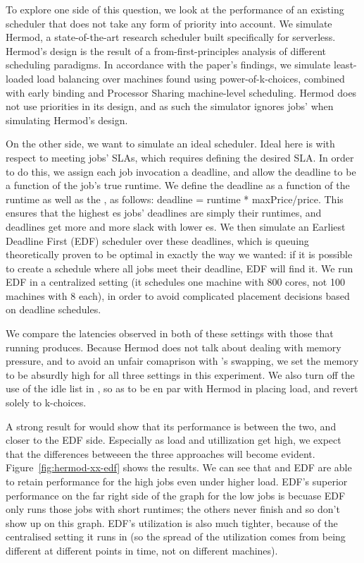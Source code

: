 To explore one side of this question, we look at the performance of an existing
scheduler that does not take any form of priority into account. We simulate
Hermod\cite{hermod}, a state-of-the-art research scheduler built specifically
for serverless. Hermod's design is the result of a from-first-principles
analysis of different scheduling paradigms. In accordance with the paper's
findings, we simulate least-loaded load balancing over machines found using
power-of-k-choices, combined with early binding and Processor Sharing
machine-level scheduling. Hermod does not use priorities in its design, and as
such the simulator ignores jobs' \class{} when simulating Hermod's design.


On the other side, we want to simulate an ideal scheduler. Ideal here is with
respect to meeting jobs' SLAs, which requires defining the desired SLA. In order
to do this, we assign each job invocation a deadline, and allow the deadline to
be a function of the job's true runtime. We define the deadline as a function of
the runtime as well as the \priceclass{}, as follows: deadline = runtime *
maxPrice/price. This ensures that the highest \class{}es jobs' deadlines are
simply their runtimes, and deadlines get more and more slack with lower
\class{}es. We then simulate an Earliest Deadline First (EDF) scheduler over
these deadlines, which is queuing theoretically proven to be optimal in exactly
the way we wanted: if it is possible to create a schedule where all jobs meet
their deadline, EDF will find it\cite{wiki-edf}. We run EDF in a centralized
setting (it schedules one machine with 800 cores, not 100 machines with 8 each),
in order to avoid complicated placement decisions based on deadline schedules.

We compare the latencies observed in both of these settings with those that
running \sys{} produces. Because Hermod does not talk about dealing with memory
pressure, and to avoid an unfair comaprison with \sys{}'s swapping, we set the
memory to be absurdly high for all three settings in this experiment. We also
turn off the use of the idle list in \sys{}, so as to be en par with Hermod in
placing load, and revert solely to k-choices.

A strong result for \sys{} would show that its performance is between the two,
and closer to the EDF side. Especially as load and utillization get high, we
expect that the differences betweeen the three approaches will become evident.
Figure~\ref{fig:hermod-xx-edf} shows the results. We can see that \sys{} and EDF
are able to retain performance for the high \class{} jobs even under higher
load. EDF's superior performance on the far right side of the graph for the low
\class{} jobs is becuase EDF only runs those jobs with short runtimes; the
others never finish and so don't show up on this graph. EDF's utilization is
also much tighter, because of the centralised setting it runs in (so the spread
of the utilization comes from being different at different points in time, not
on different machines).


